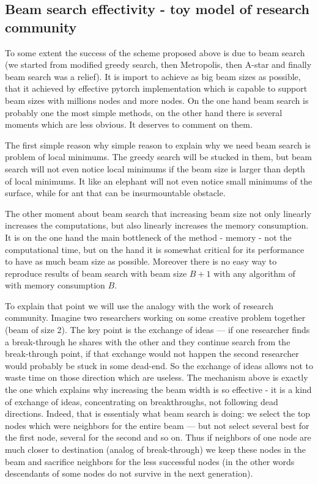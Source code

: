\documentclass[atmp]{ipart_v1}
\numberwithin{equation}{section}
\theoremstyle{plain}%
\begin{document}
\subsection{Beam search effectivity - toy model of research community }

To some extent the success of the scheme proposed above is due to beam search (we started from modified greedy search, then Metropolis, then A-star and finally beam search was a relief). It is import to achieve as big beam sizes as possible, that it achieved by effective pytorch implementation which  is capable to support beam sizes with millions nodes and more  nodes. On the one hand beam search is probably one the most simple methods, on the other hand there is several moments which are less obvious. It deserves to comment on them. 

The first simple reason why simple reason to explain why we need beam search is problem of local minimums. The greedy search will be stucked in them, but beam search will not even notice local minimums if the beam size is larger than depth of local minimums. 
It like an elephant will not even notice small minimums of the surface, while for ant that can be insurmountable obstacle. 

The other moment about beam search that increasing beam size not only linearly increases the computations, but also linearly increases the memory consumption. It is on the one hand the main bottleneck of the method - memory - not the computational time, but on the hand it is somewhat critical for its performance to have as much beam size as possible. Moreover there is no easy way to reproduce results of beam search with beam size $B+1$ with any algorithm of with memory consumption $B$.  

To explain that point we will use the analogy with the work of research community.
Imagine two researchers working on some creative problem together (beam of size 2). The key point is the exchange of ideas --- if one researcher finds a break-through he shares with the other and they continue search from the break-through point, if that exchange would not happen the second researcher would probably be stuck in some dead-end.  So the exchange of ideas allows not to waste time on those direction which are useless. 
The mechanism above is exactly the one which explains why increasing the beam width is so effective - it is a kind of exchange of ideas, concentrating on breakthroughs, not following dead directions.  Indeed, that is essentialy what beam search is doing: we select the top nodes which were neighbors for the entire beam --- but not select several best for the first node, several for the second and so on. Thus if neighbors of one node are much closer to destination (analog of break-through) we keep these nodes in the beam and sacrifice neighbors for the less successful nodes (in the other words descendants of some nodes do not survive in the next generation).
\end{document}
